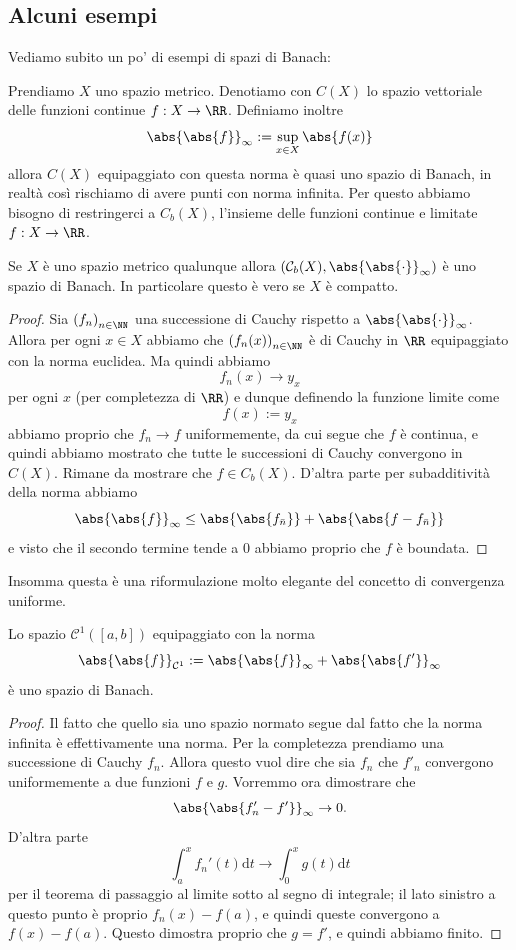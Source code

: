 \documentclass[11pt]{scrartcl}
\newcommand{\dif}{\text{d}}
\begin{document}
	\subsection{Alcuni esempi}
	Vediamo subito un po' di esempi di spazi di Banach:
	\begin{example}
		Prendiamo $X$ uno spazio metrico. Denotiamo con $C(X)$ lo spazio vettoriale delle funzioni continue $f:X\to\RR$. Definiamo inoltre
		$$\abs{\abs{f}}_\infty:=\sup_{x\in X}\abs{f(x)}$$
		allora $C(X)$ equipaggiato con questa norma è quasi uno spazio di Banach, in realtà così rischiamo di avere punti con norma infinita. Per questo abbiamo bisogno di restringerci a $C_b(X)$, l'insieme delle funzioni continue e limitate $f:X\to\RR$.
	\end{example}
	\begin{proposition}
		Se $X$ è uno spazio metrico qualunque allora $\left(\mathcal{C}_b(X),\abs{\abs{\cdot}}_\infty\right)$ è uno spazio di Banach. In particolare questo è vero se $X$ è compatto.
	\end{proposition}
	\begin{proof}
		Sia $\left(f_n\right)_{n\in\NN}$ una successione di Cauchy rispetto a $\abs{\abs{\cdot}}_\infty$. Allora per ogni $x\in X$ abbiamo che $\left(f_n(x)\right)_{n\in\NN}$ è di Cauchy in $\RR$ equipaggiato con la norma euclidea. Ma quindi abbiamo
		$$f_n(x)\to y_x$$
		per ogni $x$ (per completezza di $\RR$) e dunque definendo la funzione limite come 
		$$f(x):=y_x$$
		abbiamo proprio che $f_n\to f$ uniformemente, da cui segue che $f$ è continua, e quindi abbiamo mostrato che tutte le successioni di Cauchy convergono in $C(X)$. Rimane da mostrare che $f\in C_b(X)$. D'altra parte per subadditività della norma abbiamo
		$$\abs{\abs{f}}_\infty\le \abs{\abs{f_{\bar{n}}}}+\abs{\abs{f-f_{\bar{n}}}}$$
		e visto che il secondo termine tende a $0$ abbiamo proprio che $f$ è boundata.
	\end{proof}
	Insomma questa è una riformulazione molto elegante del concetto di convergenza uniforme.
	\begin{example}
		Lo spazio $\mathcal{C}^1\left(\left[a,b\right]\right)$ equipaggiato con la norma
		$$\abs{\abs{f}}_{\mathcal{C}^1}:=\abs{\abs{f}}_\infty+\abs{\abs{f'}}_\infty$$
		è uno spazio di Banach.
	\end{example}
	\begin{proof}
		Il fatto che quello sia uno spazio normato segue dal fatto che la norma infinita è effettivamente una norma. Per la completezza prendiamo una successione di Cauchy $f_n$. Allora questo vuol dire che sia $f_n$ che $f'_n$ convergono uniformemente a due funzioni $f$ e $g$. Vorremmo ora dimostrare che 
		$$\abs{\abs{f'_n-f'}}_\infty\to 0.$$
		D'altra parte 
		$$\int_a^x f_n'(t)\dif t\to \int_0^x g(t)\dif t$$
		per il teorema di passaggio al limite sotto al segno di integrale; il lato sinistro a questo punto è proprio $f_n(x)-f(a)$, e quindi queste convergono a $f(x)-f(a)$. Questo dimostra proprio che $g=f'$, e quindi abbiamo finito. 
	\end{proof}
\end{document}
